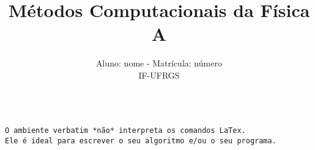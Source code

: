 \documentclass[brazilian,12pt,a4paper,final]{article}
\title{Métodos Computacionais da Física A}
\author{Aluno: nome - Matrícula: número \\ IF-UFRGS}
\begin{document}
\maketitle

\begin{verbatim}

O ambiente verbatim *não* interpreta os comandos LaTex.
Ele é ideal para escrever o seu algoritmo e/ou o seu programa.


\end{verbatim}
\end{document}
